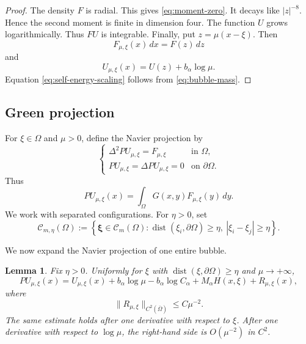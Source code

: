 \documentclass[11pt]{article}
\newtheorem{lemma}[theorem]{Lemma}
\numberwithin{equation}{section}
\begin{document}
\begin{proof}
The density $F$ is radial. This gives \eqref{eq:moment-zero}. It decays like $|z|^{-8}$. Hence the second moment is finite in dimension four. The function $U$ grows logarithmically. Thus $FU$ is integrable. Finally, put $z=\mu(x-\xi)$. Then
\[
F_{\mu,\xi}(x)\,dx=F(z)\,dz
\]
and
\[
U_{\mu,\xi}(x)=U(z)+b_{\alpha}\log\mu.
\]
Equation \eqref{eq:self-energy-scaling} follows from \eqref{eq:bubble-mass}.
\end{proof}

\subsection{Green projection}

For $\xi\in\Omega$ and $\mu>0$, define the Navier projection by
\begin{equation}\label{eq:projection-definition}
\begin{cases}
\Delta^{2}P U_{\mu,\xi}=F_{\mu,\xi}
&\text{in }\Omega,\\
P U_{\mu,\xi}=\Delta P U_{\mu,\xi}=0
&\text{on }\partial\Omega.
\end{cases}
\end{equation}
Thus
\begin{equation}\label{eq:projection-Green}
P U_{\mu,\xi}(x)
=\int_{\Omega}G(x,y)F_{\mu,\xi}(y)\,dy.
\end{equation}
We work with separated configurations. For $\eta>0$, set
\begin{equation*}
\mathcal C_{m,\eta}(\Omega)
:=\left\{\boldsymbol\xi\in\mathcal C_{m}(\Omega):
\operatorname{dist}(\xi_{i},\partial\Omega)\geq\eta,
\ |\xi_{i}-\xi_{j}|\geq\eta
\right\}.
\end{equation*}

We now expand the Navier projection of one entire bubble.

\begin{lemma}\label{lem:projection-expansion}
Fix $\eta>0$. Uniformly for $\xi$ with $\operatorname{dist}(\xi,\partial\Omega)\geq\eta$ and $\mu\to+\infty$,
\begin{equation}\label{eq:projection-expansion}
P U_{\mu,\xi}(x)
=U_{\mu,\xi}(x)
+b_{\alpha}\log\mu-b_{\alpha}\log C_{\alpha}
+M_{\alpha}H(x,\xi)
+R_{\mu,\xi}(x),
\end{equation}
where
\begin{equation}\label{eq:projection-remainder}
\|R_{\mu,\xi}\|_{C^{2}(\overline\Omega)}
\leq C\mu^{-2}.
\end{equation}
The same estimate holds after one derivative with respect to $\xi$. After one derivative with respect to $\log\mu$, the right-hand side is $O(\mu^{-2})$ in $C^{2}$.
\end{lemma}
\end{document}
